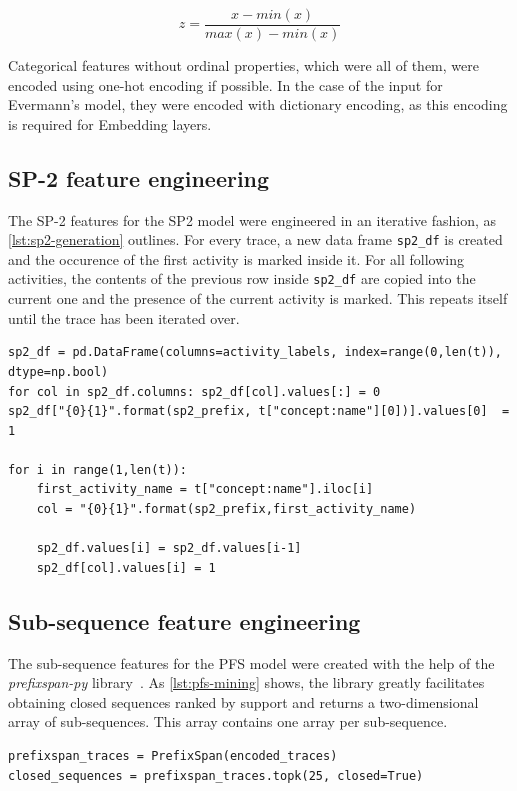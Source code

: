 $$z = \frac{x-min(x)}{max(x)-min(x)}$$

Categorical features without ordinal properties, which were all of them, were encoded using one-hot encoding if possible. In the case of the input for Evermann's model, they were encoded with dictionary encoding, as this encoding is required for Embedding layers.

\subsection*{SP-2 feature engineering}
The SP-2 features for the SP2 model were engineered in an iterative fashion, as \autoref{lst:sp2-generation} outlines. For every trace, a new data frame \texttt{sp2\_df} is created and the occurence of the first activity is marked inside it. For all following activities, the contents of the previous row inside \texttt{sp2\_df} are copied into the current one and the presence of the current activity is marked. This repeats itself until the trace has been iterated over.

\begin{lstlisting}[caption={SP-2 feature generation algorithm for a single trace},label={lst:sp2-generation}]
sp2_df = pd.DataFrame(columns=activity_labels, index=range(0,len(t)), dtype=np.bool)
for col in sp2_df.columns: sp2_df[col].values[:] = 0
sp2_df["{0}{1}".format(sp2_prefix, t["concept:name"][0])].values[0]  = 1

for i in range(1,len(t)):
    first_activity_name = t["concept:name"].iloc[i]
    col = "{0}{1}".format(sp2_prefix,first_activity_name)
    
    sp2_df.values[i] = sp2_df.values[i-1]
    sp2_df[col].values[i] = 1
\end{lstlisting}

\subsection*{Sub-sequence feature engineering}
The sub-sequence features for the PFS model were created with the help of the \textit{prefixspan-py} library~\cite{web:prefixspan-py}. As \autoref{lst:pfs-mining} shows, the library greatly facilitates obtaining closed sequences ranked by support and returns a two-dimensional array of sub-sequences. This array contains one array per sub-sequence.

\begin{lstlisting}[caption={Obtaining closed sequences using the \textit{prefixspan-py} library.}, label={lst:pfs-mining}]
prefixspan_traces = PrefixSpan(encoded_traces)
closed_sequences = prefixspan_traces.topk(25, closed=True)
\end{lstlisting}

